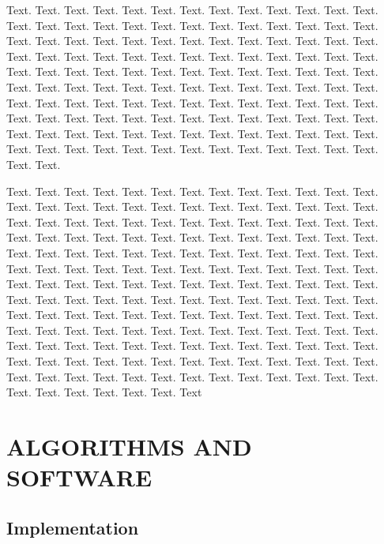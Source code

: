 \documentclass[a4,center,fleqn]{NAR}
\begin{document}
Text. Text. Text. Text. Text. Text. Text. Text. Text. Text. Text.
Text. Text. Text. Text. Text. Text. Text. Text. Text. Text. Text.
Text. Text. Text. Text. Text. Text. Text. Text. Text. Text. Text.
Text. Text. Text. Text. Text. Text. Text. Text. Text. Text. Text.
Text. Text. Text. Text. Text. Text. Text. Text. Text. Text. Text.
Text. Text. Text. Text. Text. Text. Text. Text. Text. Text. Text.
Text. Text. Text. Text. Text. Text. Text. Text. Text. Text. Text.
Text. Text. Text. Text. Text. Text. Text. Text. Text. Text. Text.
Text. Text. Text. Text. Text. Text. Text. Text. Text. Text. Text.
Text. Text. Text. Text. Text. Text. Text. Text. Text. Text. Text.
Text. Text. Text. Text. Text. Text. Text. Text. Text. Text. Text.
Text. Text. Text. Text. Text. Text. Text. Text. Text. Text. Text.


Text. Text. Text. Text. Text. Text.
Text. Text. Text. Text. Text. Text. Text. Text. Text. Text. Text.
Text. Text. Text. Text. Text. Text. Text. Text. Text. Text. Text.
Text. Text. Text. Text. Text. Text. Text. Text. Text. Text. Text.
Text. Text. Text. Text. Text. Text. Text. Text. Text. Text. Text.
Text. Text. Text. Text. Text. Text. Text. Text. Text. Text. Text.
Text. Text. Text. Text. Text. Text. Text. Text. Text. Text. Text.
Text. Text. Text. Text. Text. Text. Text. Text. Text. Text. Text.
Text. Text. Text. Text. Text. Text. Text. Text. Text. Text. Text.
Text. Text. Text. Text. Text. Text. Text. Text. Text. Text. Text.
Text. Text. Text. Text. Text. Text. Text. Text. Text. Text. Text.
Text. Text. Text. Text. Text. Text. Text. Text. Text. Text. Text.
Text. Text. Text. Text. Text. Text. Text. Text. Text. Text. Text.
Text. Text. Text. Text. Text. Text. Text. Text. Text. Text. Text.
Text. Text. Text. Text. Text. Text. Text. Text. Text. Text. Text.
Text. Text. Text. Text. Text. Text. Text. Text. Text. Text. Text.
Text. Text. Text. Text.
Text 

\section{ALGORITHMS AND SOFTWARE}

\subsection{Implementation}
\end{document}
